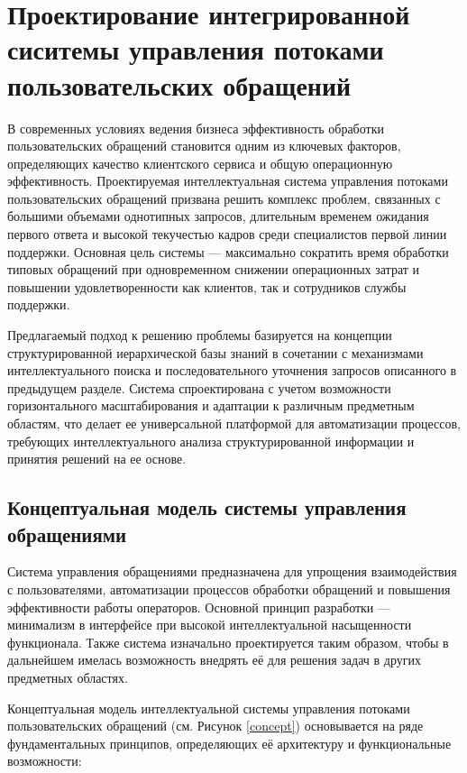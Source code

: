 \section{Проектирование интегрированной сиситемы управления потоками пользовательских обращений}
\label{sec:designing}

В современных условиях ведения бизнеса эффективность обработки пользовательских обращений становится одним из ключевых факторов, определяющих качество клиентского сервиса и общую операционную эффективность. Проектируемая интеллектуальная система управления потоками пользовательских обращений призвана решить комплекс проблем, связанных с большими объемами однотипных запросов, длительным временем ожидания первого ответа и высокой текучестью кадров среди специалистов первой линии поддержки. Основная цель системы — максимально сократить время обработки типовых обращений при одновременном снижении операционных затрат и повышении удовлетворенности как клиентов, так и сотрудников службы поддержки.

Предлагаемый подход к решению проблемы базируется на концепции структурированной иерархической базы знаний в сочетании с механизмами интеллектуального поиска и последовательного уточнения запросов описанного в предыдущем разделе. Система спроектирована с учетом возможности горизонтального масштабирования и адаптации к различным предметным областям, что делает ее универсальной платформой для автоматизации процессов, требующих интеллектуального анализа структурированной информации и принятия решений на ее основе.

\subsection{Концептуальная модель системы управления обращениями}

Система управления обращениями предназначена для упрощения взаимодействия с пользователями, автоматизации процессов обработки обращений и повышения эффективности работы операторов. Основной принцип разработки — минимализм в интерфейсе при высокой интеллектуальной насыщенности функционала. Также система изначально проектируется таким образом, чтобы в дальнейшем имелась возможность внедрять её для решения задач в других предметных областях.

Концептуальная модель интеллектуальной системы управления потоками пользовательских обращений (см. Рисунок \ref{concept}) основывается на ряде фундаментальных принципов, определяющих её архитектуру и функциональные возможности:

